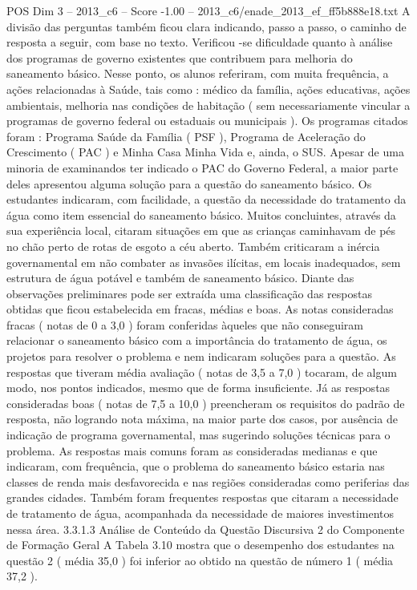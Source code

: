 \begin{textsample}{POS Dim 3 – 2013\_c6 – Score -1.00 – 2013\_c6/enade\_2013\_ef\_ff5b888e18.txt}
A divisão das perguntas também ficou clara indicando, passo a passo, o caminho de resposta a seguir, com base no texto.
Verificou -se dificuldade quanto à análise dos programas de governo existentes que contribuem para melhoria do saneamento básico.
Nesse ponto, os alunos referiram, com muita frequência, a ações relacionadas à Saúde, tais como : médico da família, ações educativas, ações ambientais, melhoria nas condições de habitação ( sem necessariamente vincular a programas de governo federal ou estaduais ou municipais ).
Os programas citados foram : Programa Saúde da Família ( PSF ), Programa de Aceleração do Crescimento ( PAC ) e Minha Casa Minha Vida e, ainda, o SUS.
Apesar de uma minoria de examinandos ter indicado o PAC do Governo Federal, a maior parte deles apresentou alguma solução para a questão do saneamento básico.
Os estudantes indicaram, com facilidade, a questão da necessidade do tratamento da água como item essencial do saneamento básico.
Muitos concluintes, através da sua experiência local, citaram situações em que as crianças caminhavam de pés no chão perto de rotas de esgoto a céu aberto.
Também criticaram a inércia governamental em não combater as invasões ilícitas, em locais inadequados, sem estrutura de água potável e também de saneamento básico.
Diante das observações preliminares pode ser extraída uma classificação das respostas obtidas que ficou estabelecida em fracas, médias e boas.
As notas consideradas fracas ( notas de 0 a 3,0 ) foram conferidas àqueles que não conseguiram relacionar o saneamento básico com a importância do tratamento de água, os projetos para resolver o problema e nem indicaram soluções para a questão.
As respostas que tiveram média avaliação ( notas de 3,5 a 7,0 ) tocaram, de algum modo, nos pontos indicados, mesmo que de forma insuficiente.
Já as respostas consideradas boas ( notas de 7,5 a 10,0 ) preencheram os requisitos do padrão de resposta, não logrando nota máxima, na maior parte dos casos, por ausência de indicação de programa governamental, mas sugerindo soluções técnicas para o problema.
As respostas mais comuns foram as consideradas medianas e que indicaram, com frequência, que o problema do saneamento básico estaria nas classes de renda mais desfavorecida e nas regiões consideradas como periferias das grandes cidades.
Também foram frequentes respostas que citaram a necessidade de tratamento de água, acompanhada da necessidade de maiores investimentos nessa área. 3.3.1.3 Análise de Conteúdo da Questão Discursiva 2 do Componente de Formação Geral A Tabela 3.10 mostra que o desempenho dos estudantes na questão 2 ( média 35,0 ) foi inferior ao obtido na questão de número 1 ( média 37,2 ).

\end{textsample}

